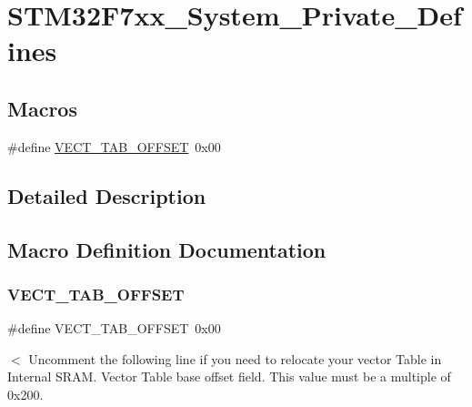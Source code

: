 \hypertarget{group___s_t_m32_f7xx___system___private___defines}{}\section{S\+T\+M32\+F7xx\+\_\+\+System\+\_\+\+Private\+\_\+\+Defines}
\label{group___s_t_m32_f7xx___system___private___defines}
\subsection*{Macros}
\begin{DoxyCompactItemize}
\item 
\#define \mbox{\hyperlink{group___s_t_m32_f7xx___system___private___defines_ga40e1495541cbb4acbe3f1819bd87a9fe}{V\+E\+C\+T\+\_\+\+T\+A\+B\+\_\+\+O\+F\+F\+S\+ET}}~0x00
\end{DoxyCompactItemize}


\subsection{Detailed Description}


\subsection{Macro Definition Documentation}
\mbox{\label{group___s_t_m32_f7xx___system___private___defines_ga40e1495541cbb4acbe3f1819bd87a9fe}} 
\subsubsection{\texorpdfstring{VECT\_TAB\_OFFSET}{VECT\_TAB\_OFFSET}}
{\footnotesize\ttfamily \#define V\+E\+C\+T\+\_\+\+T\+A\+B\+\_\+\+O\+F\+F\+S\+ET~0x00}

$<$ Uncomment the following line if you need to relocate your vector Table in Internal S\+R\+AM. Vector Table base offset field. This value must be a multiple of 0x200. 